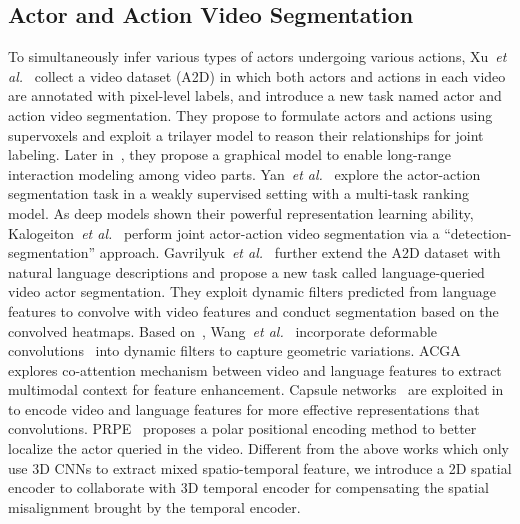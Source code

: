 \documentclass[final]{cvpr}
\begin{document}
\subsection{Actor and Action Video Segmentation}
To simultaneously infer various types of actors undergoing various actions, Xu~\textit{et al.}~\cite{xu2015can} collect a video dataset (A2D) in which both actors and actions in each video are annotated with pixel-level labels, and introduce a new task named actor and action video segmentation. 
They propose to formulate actors and actions using supervoxels and exploit a trilayer model to reason their relationships for joint labeling. 
Later in~\cite{xu2016actor}, they propose a graphical model to enable long-range interaction modeling among video parts. 
Yan~\textit{et al.}~\cite{yan2017weakly} explore the actor-action segmentation task in a weakly supervised setting with a multi-task ranking model. 
As deep models shown their powerful representation learning ability, Kalogeiton~\textit{et al.}~\cite{kalogeiton2017joint} perform joint actor-action video segmentation via a ``detection-segmentation'' approach. 
Gavrilyuk~\textit{et al.}~\cite{gavrilyuk2018actor} further extend the A2D dataset with natural language descriptions and propose a new task called language-queried video actor segmentation. 
They exploit dynamic filters predicted from language features to convolve with video features and conduct segmentation based on the convolved heatmaps. 
Based on~\cite{gavrilyuk2018actor}, Wang~\textit{et al.}~\cite{wang2020context} incorporate deformable convolutions~\cite{dai2017deformable} into dynamic filters to capture geometric variations. 
ACGA~\cite{wang2019asymmetric} explores co-attention mechanism between video and language features to extract multimodal context for feature enhancement. 
Capsule networks~\cite{sabour2017dynamic} are exploited in~\cite{mcintosh2020visual} to encode video and language features for more effective representations that convolutions. 
PRPE~\cite{ning2020polar} proposes a polar positional encoding method to better localize the actor queried in the video. 
Different from the above works which only use 3D CNNs to extract mixed spatio-temporal feature, we introduce a 2D spatial encoder to collaborate with 3D temporal encoder for compensating the spatial misalignment brought by the temporal encoder. 
\end{document}
